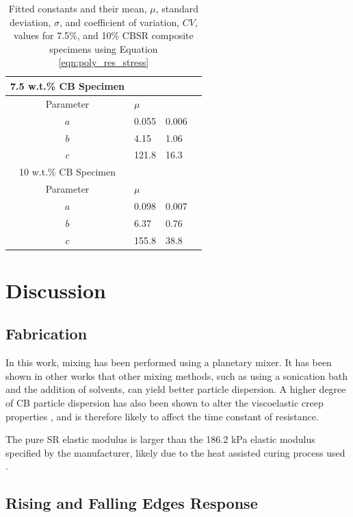 \begin{table}[H]
	\caption{Fitted constants and their mean, $\mu$, standard deviation, $\sigma$, and coefficient of variation, $CV$, values for 7.5\%, and 10\% CBSR composite specimens using Equation \ref{eqn:poly_res_stress}}
	\begin{center}
		\label{tab:generalised_model_constants}
		\begin{tabular}{c l l l}
			7.5 w.t.\% CB Specimen \\
			\hline
			Parameter & $\mu$ \\
			\hline
			$a$ & 0.055 & 0.006 \\
			$b$ & 4.15 & 1.06 \\
			$c$ & 121.8 & 16.3 \\
			\hline
			10 w.t.\% CB Specimen \\
			\hline
			Parameter & $\mu$ \\
			\hline
			$a$ & 0.098 & 0.007 \\
			$b$ & 6.37 & 0.76 \\
			$c$ & 155.8 & 38.8 \\
			\hline
		\end{tabular}
	\end{center}
\end{table}


\section{Discussion}

\subsection{Fabrication}
In this work, mixing has been performed using a planetary mixer. It has been shown in other works \cite{Xu2016,Spahr2017} that other mixing methods, such as using a sonication bath and the addition of solvents, can yield better particle dispersion. A higher degree of CB particle dispersion has also been shown to alter the viscoelastic creep properties \cite{Xu2016}, and is therefore likely to affect the time constant of resistance.

The pure SR elastic modulus is larger than the 186.2 kPa elastic modulus specified by the manufacturer, likely due to the heat assisted curing process used \cite{Johnston2014}.

\subsection{Rising and Falling Edges Response}


